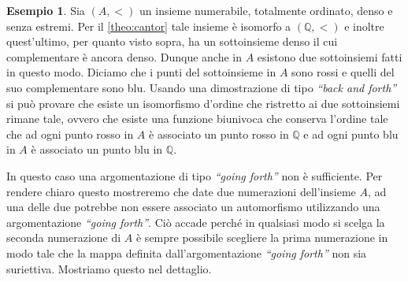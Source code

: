 \documentclass[12pt,a4paper,openright]{report}
\newcommand{\Q}{\mathbb{Q}} %
\newcommand{\0}{\setminus\{0\}} %
\theoremstyle{definition}
\newtheorem{es}[defn]{Esempio}
\theoremstyle{plain}
\begin{document}
\begin{es}
    Sia $(A,<)$ un insieme numerabile, totalmente ordinato, denso e senza estremi. Per il \cref{theo:cantor} tale insieme è isomorfo a $(\Q,<)$ e inoltre quest'ultimo, per quanto visto sopra, ha un sottoinsieme denso il cui complementare è ancora denso. Dunque anche in $A$ esistono due sottoinsiemi fatti in questo modo. Diciamo che i punti del sottoinsieme in $A$ sono rossi e quelli del suo complementare sono blu. Usando una dimostrazione di tipo \emph{``back and forth''} si può provare che esiste un isomorfismo d'ordine che ristretto ai due sottoinsiemi rimane tale, ovvero che esiste una funzione biunivoca che conserva l'ordine tale che ad ogni punto rosso in $A$ è associato un punto rosso in $\Q$ e ad ogni punto blu in $A$ è associato un punto blu in $\Q$.

    In questo caso una argomentazione di tipo \emph{``going forth''} non è sufficiente. Per rendere chiaro questo mostreremo che date due numerazioni dell'insieme $A$, ad una delle due potrebbe non essere associato un automorfismo utilizzando una argomentazione \emph{``going forth''}. Ciò accade perché in qualsiasi modo si scelga la seconda numerazione di $A$ è sempre possibile scegliere la prima numerazione in modo tale che la mappa definita dall'argomentazione \emph{``going forth''} non sia suriettiva. Mostriamo questo nel dettaglio.


\end{es}
\end{document}
